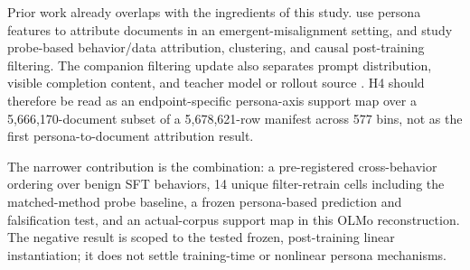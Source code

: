 Prior work already overlaps with the ingredients of this study.
\citet{vetter2026data} use persona features to attribute documents in an
emergent-misalignment setting, and \citet{xiao2026probebased} study
probe-based behavior/data attribution, clustering, and causal post-training
filtering. The companion filtering update also separates prompt
distribution, visible completion content, and teacher model or rollout
source \citep{engels2026filters}. H4 should therefore be read as an
endpoint-specific persona-axis support map over a 5,666,170-document subset
of a 5,678,621-row manifest across 577 bins, not as the first
persona-to-document attribution result.

The narrower contribution is the combination: a pre-registered
cross-behavior ordering over benign SFT behaviors, 14 unique filter-retrain cells
including the matched-method  probe baseline, a
frozen persona-based prediction and falsification test, and an actual-corpus
support map in this OLMo reconstruction. The negative result is scoped to
the tested frozen, post-training linear instantiation; it does not settle
training-time or nonlinear persona mechanisms.
